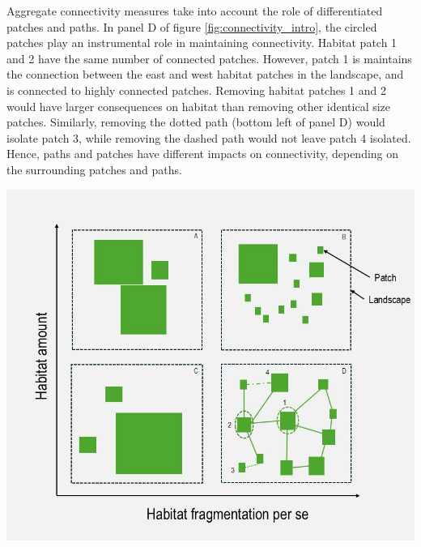 \begin{tcolorbox}[breakable, 
colback =verylightgray, 
colframe=gray!75!black,
title={Box 2 - Habitat Loss, Fragmentation and Connectivity},
fontupper=\small]
 Aggregate connectivity measures take into account the role of differentiated patches and paths. In panel D of figure \ref{fig:connectivity_intro}, the circled patches play an instrumental role in maintaining connectivity. Habitat patch 1 and 2 have the same number of connected patches. However, patch 1 is maintains the connection between the east and west habitat patches in the landscape, and is connected to highly connected patches. Removing habitat patches 1 and 2 would have larger consequences on habitat than removing other identical size patches. Similarly, removing the dotted path (bottom left of panel D) would isolate patch 3, while removing the dashed path would not leave patch 4 isolated. Hence, paths and patches have different impacts on connectivity, depending on the surrounding patches and paths.
\\%
\begin{center}
\includegraphics[width = .8\textwidth]{figures/intro/fragmentation.jpg}
\label{fig:connectivity_intro}
\end{center}
\end{tcolorbox}
	
